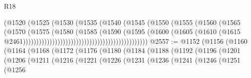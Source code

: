 \begin{lexlean}{R18}
\begin{coremodule}
                                                          (@1520
                                                            (@1525
                                                              (@1530
                                                                (@1535
                                                                  (@1540
                                                                    (@1545
                                                                      (@1550
                                                                        (@1555
                                                                          (@1560
                                                                            (@1565
                                                                              (@1570
                                                                                (@1575
                                                                                  (@1580
                                                                                    (@1585
                                                                                      (@1590
                                                                                        (@1595
                                                                                          (@1600
                                                                                            (@1605
                                                                                              (@1610
                                                                                                (@1615
                                                                                                  @2461)))))))))))))))))))))))))))))))))))))))))))))))
@2557 := @1152
    (@1156
      (@1160
        (@1164
          (@1168
            (@1172
              (@1176
                (@1180
                  (@1184
                    (@1188
                      (@1192
                        (@1196
                          (@1201
                            (@1206
                              (@1211
                                (@1216
                                  (@1221
                                    (@1226
                                      (@1231
                                        (@1236
                                          (@1241
                                            (@1246
                                              (@1251
                                                (@1256

\end{coremodule}
\end{lexlean}
